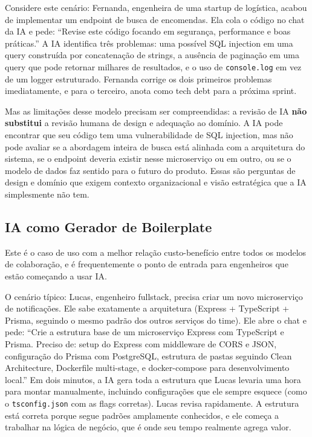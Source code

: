 Considere este cenário: Fernanda, engenheira de uma startup de logística, acabou de
implementar um endpoint de busca de encomendas. Ela cola o código no chat da IA e
pede: ``Revise este código focando em segurança, performance e boas práticas.'' A IA
identifica três problemas: uma possível SQL injection em uma query construída por
concatenação de strings, a ausência de paginação em uma query que pode retornar
milhares de resultados, e o uso de \texttt{console.log} em vez de um logger
estruturado. Fernanda corrige os dois primeiros problemas imediatamente, e para o
terceiro, anota como tech debt para a próxima sprint.

Mas as limitações desse modelo precisam ser compreendidas: a revisão de IA \textbf{não
substitui} a revisão humana de design e adequação ao domínio. A IA pode encontrar que
seu código tem uma vulnerabilidade de SQL injection, mas não pode avaliar se a
abordagem inteira de busca está alinhada com a arquitetura do sistema, se o
endpoint deveria existir nesse microserviço ou em outro, ou se o modelo de dados
faz sentido para o futuro do produto. Essas são perguntas de design e domínio que
exigem contexto organizacional e visão estratégica que a IA simplesmente não tem.

\subsection{IA como Gerador de Boilerplate}

Este é o caso de uso com a melhor relação custo-benefício entre todos os modelos de
colaboração, e é frequentemente o ponto de entrada para engenheiros que estão começando
a usar IA.

O cenário típico: Lucas, engenheiro fullstack, precisa criar um novo microserviço de
notificações. Ele sabe exatamente a arquitetura (Express + TypeScript + Prisma,
seguindo o mesmo padrão dos outros serviços do time). Ele abre o chat e pede: ``Crie a
estrutura base de um microserviço Express com TypeScript e Prisma. Preciso de: setup
do Express com middleware de CORS e JSON, configuração do Prisma com PostgreSQL,
estrutura de pastas seguindo Clean Architecture, Dockerfile multi-stage, e
docker-compose para desenvolvimento local.'' Em dois minutos, a IA gera toda a
estrutura que Lucas levaria uma hora para montar manualmente, incluindo configurações
que ele sempre esquece (como o \texttt{tsconfig.json} com as flags corretas). Lucas
revisa rapidamente. A estrutura está correta porque segue padrões amplamente
conhecidos, e ele começa a trabalhar na lógica de negócio, que é onde seu tempo
realmente agrega valor.

